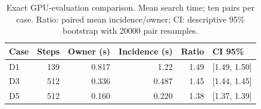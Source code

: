 \begin{table}[tbp]\centering\small
\caption{Exact GPU-evaluation comparison. Mean search time; ten pairs per case. Ratio: paired mean incidence/owner; CI: descriptive 95\% bootstrap with 20000 pair resamples.}
\label{tab:owner-micro}
\begin{tabular}{lrrrrl}\toprule
Case & Steps & Owner (s) & Incidence (s) & Ratio & CI 95\%\\\midrule
D1 & 139 & 0.817 & 1.22 & 1.49 & [1.49, 1.50]\\
D3 & 512 & 0.336 & 0.487 & 1.45 & [1.44, 1.45]\\
D5 & 512 & 0.160 & 0.220 & 1.38 & [1.37, 1.39]\\
\bottomrule\end{tabular}\end{table}
